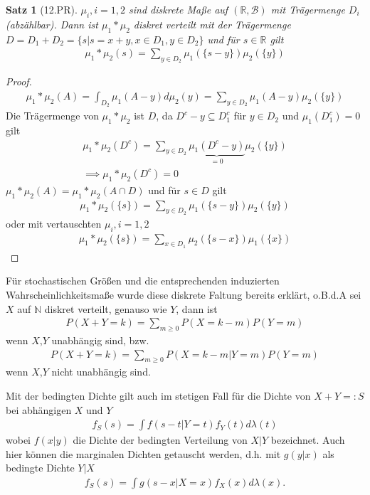 \documentclass[]{article}
\newtheorem{theorem}{Satz}
\begin{document}
\begin{theorem}[12.PR]
	$\mu_i, i=1,2$ sind diskrete Maße auf $(\mathbb{R}, \mathcal{B})$ mit Trägermenge $D_i$ (abzählbar). Dann ist $\mu_1 * \mu_2$ diskret verteilt mit der Trägermenge $D = D_1 + D_2 = \{s|s=x+y, x\in D_1, y\in D_2\}$ und für $s\in \mathbb{R}$ gilt
	\begin{align*}
		\mu_1 * \mu_2(s) = \sum_{y \in D_2} \mu_1(\{s-y\})\mu_2(\{y\})
	\end{align*}
\end{theorem}
\begin{proof}
	\begin{align*}
		\mu_1 * \mu_2 (A) = \int_{D_2} \mu_1(A-y) d\mu_2(y) = \sum_{y\in D_2} \mu_1(A-y)\mu_2(\{y\})
	\end{align*}
	Die Trägermenge von $\mu_1 * \mu_2$ ist $D$, da $D^c-y \subseteq D_1^c$ für $y\in D_2$ und $\mu_1(D_1^c)=0$ gilt
	\begin{align*}
		\mu_1 * \mu_2 (D^c) = \sum_{y \in D_2} \underbrace{\mu_1(D^c-y)}_{=0}\mu_2(\{y\})\\
		\implies \mu_1 * \mu_2 (D^c) = 0
	\end{align*}
	$\mu_1 * \mu_2(A) = \mu_1 * \mu_2 (A\cap D)$ und für $s\in D$ gilt
	\begin{align*}
		\mu_1 * \mu_2 (\{s\}) = \sum_{y \in D_2} \mu_1(\{s-y\})\mu_2(\{y\})
	\end{align*}
	oder mit vertauschten $\mu_i, i=1,2$
	\begin{align*}
		\mu_1 * \mu_2 (\{s\}) = \sum_{x \in D_1} \mu_2(\{s-x\}) \mu_1(\{x\})
	\end{align*}
\end{proof}

Für stochastischen Größen und die entsprechenden induzierten Wahrscheinlichkeitsmaße wurde diese diskrete Faltung bereits erklärt, o.B.d.A sei $X$ auf $\mathbb{N}$ diskret verteilt, genauso wie $Y$, dann ist
\begin{align*}
	P(X+Y=k) = \sum_{m\geq 0} P(X=k-m) P(Y=m)
\end{align*}
wenn $X$,$Y$ unabhängig sind, bzw.
\begin{align*}
	P(X+Y=k) = \sum_{m\geq 0} P(X=k-m|Y=m) P(Y=m)
\end{align*}
wenn $X$,$Y$ nicht unabhängig sind.

Mit der bedingten Dichte gilt auch im stetigen Fall für die Dichte von $X+Y=:S$ bei abhängigen $X$ und $Y$
\begin{align*}
	f_S(s) = \int f(s-t|Y=t) f_Y(t) d\lambda(t)
\end{align*}
wobei $f(x|y)$ die Dichte der bedingten Verteilung von $X|Y$ bezeichnet. Auch hier können die marginalen Dichten getauscht werden, d.h. mit $g(y|x)$ als bedingte Dichte $Y|X$
\begin{align*}
	f_S(s) = \int g(s-x|X=x) f_X(x) d\lambda(x).
\end{align*}
\end{document}
